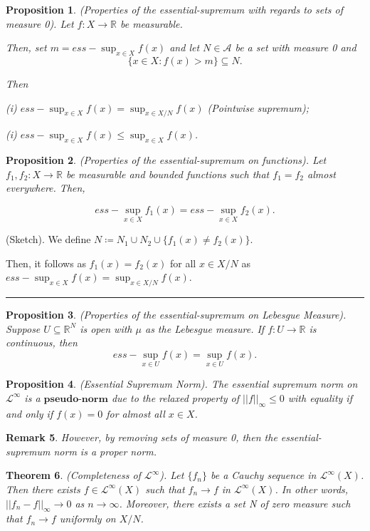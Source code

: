 \documentclass[twoside]{article}
\newcounter{lecnum}
\newtheorem{theorem}{Theorem}[lecnum]
\newtheorem{proposition}[theorem]{Proposition}
\newtheorem{remark}[theorem]{Remark}
\newenvironment{proof}{{\bf Proof:}}{\hfill\rule{2mm}{2mm}}
\begin{document}
\begin{proposition}(Properties of the essential-supremum with regards to sets of measure 0). Let $f: X \rightarrow \mathbb{R}$ be measurable. 

Then, set $m = ess-\sup_{x \in X}f(x)$ and let $N \in \mathcal{A}$ be a set with measure 0 and 
$$
\{x \in X: f(x) > m\} \subseteq N.
$$

Then

(i) $ess-\sup_{x \in X}f(x) = \sup_{x \in X/N}f(x)$ (Pointwise supremum);

(i) $ess-\sup_{x \in X}f(x) \leq \sup_{x \in X}f(x)$.
\end{proposition}

\begin{proposition}(Properties of the essential-supremum on functions). Let $f_1, f_2: X \rightarrow \mathbb{R}$ be measurable and bounded functions such that $f_1 = f_2$ almost everywhere. Then,  

$$
ess-\sup_{x \in X}f_1(x) = ess-\sup_{x \in X}f_2(x).
$$
\end{proposition}

\begin{proof}(Sketch). We define $N \coloneqq N_1 \cup N_2 \cup \{f_1(x) \neq f_2(x)\}$.

Then, it follows as $f_1(x) = f_2(x)$ for all $x \in X/N$ as $ess-\sup_{x \in X}f(x) = \sup_{x \in X/N}f(x)$.
\end{proof}

\begin{proposition}(Properties of the essential-supremum on Lebesgue Measure). Suppose $U \subseteq \mathbb{R}^N$ is open with $\mu$ as the Lebesgue measure. If $f: U \rightarrow \mathbb{R}$ is continuous, then
$$
ess-\sup_{x \in U}f(x) = \sup_{x \in U}f(x).
$$
\end{proposition}

\begin{proposition}(Essential Supremum Norm). The essential supremum norm on $\mathcal{L}^{\infty}$ is a $\textbf{pseudo-norm}$ due to the relaxed property of $||f||_{\infty} \leq 0$ with equality if and only if $f(x) = 0$ for almost all $x \in X$.
\end{proposition}

\begin{remark}However, by removing sets of measure 0, then the essential-supremum norm is a proper norm.
\end{remark}

\begin{theorem}(Completeness of $\mathcal{L}^{\infty}$). Let $\{f_n\}$ be a Cauchy sequence in $\mathcal{L}^{\infty}(X)$. Then there exists $f \in \mathcal{L}^{\infty}(X)$ such that $f_n \rightarrow f$ in $\mathcal{L}^{\infty}(X)$. In other words, $||f_n - f||_{\infty} \rightarrow 0$ as $n \rightarrow \infty$. Moreover, there exists a set N of zero measure such that $f_n \rightarrow f$ uniformly on $X / N$.
\end{theorem}
\end{document}

